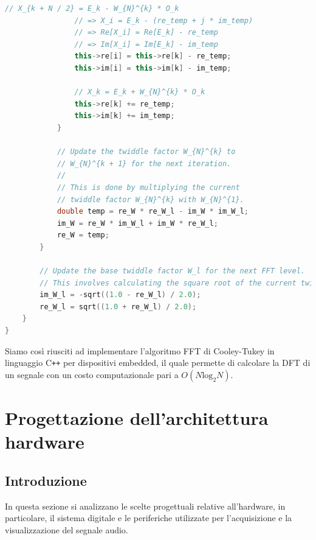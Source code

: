 \documentclass[a4paper,12pt]{report}  %
\begin{document}
\begin{lstlisting}[language=C++, keywords={void, sqrt, uint16_t, while, for, if, double, this, uint8_t}]
                // X_{k + N / 2} = E_k - W_{N}^{k} * O_k
                // => X_i = E_k - (re_temp + j * im_temp)
                // => Re[X_i] = Re[E_k] - re_temp
                // => Im[X_i] = Im[E_k] - im_temp
                this->re[i] = this->re[k] - re_temp;
                this->im[i] = this->im[k] - im_temp;
                
                // X_k = E_k + W_{N}^{k} * O_k
                this->re[k] += re_temp;
                this->im[k] += im_temp;
            }
    
            // Update the twiddle factor W_{N}^{k} to
            // W_{N}^{k + 1} for the next iteration.
            // 
            // This is done by multiplying the current
            // twiddle factor W_{N}^{k} with W_{N}^{1}.
            double temp = re_W * re_W_l - im_W * im_W_l;
            im_W = re_W * im_W_l + im_W * re_W_l;
            re_W = temp;
        }
    
        // Update the base twiddle factor W_l for the next FFT level.
        // This involves calculating the square root of the current twiddle factor.
        im_W_l = -sqrt((1.0 - re_W_l) / 2.0);
        re_W_l = sqrt((1.0 + re_W_l) / 2.0);
    }
}
\end{lstlisting}

Siamo così riusciti ad implementare l'algoritmo FFT di Cooley-Tukey in linguaggio C\texttt{++} per dispositivi embedded, il quale permette di calcolare la DFT di un segnale con un costo computazionale pari a $O(N \text{log}_2 N)$.

\section{Progettazione dell'architettura hardware}\label{sec:design}

\subsection{Introduzione}
In questa sezione si analizzano le scelte progettuali relative all'hardware, in particolare, il sistema digitale e le periferiche utilizzate per l'acquisizione e la visualizzazione del segnale audio.
\end{document}
